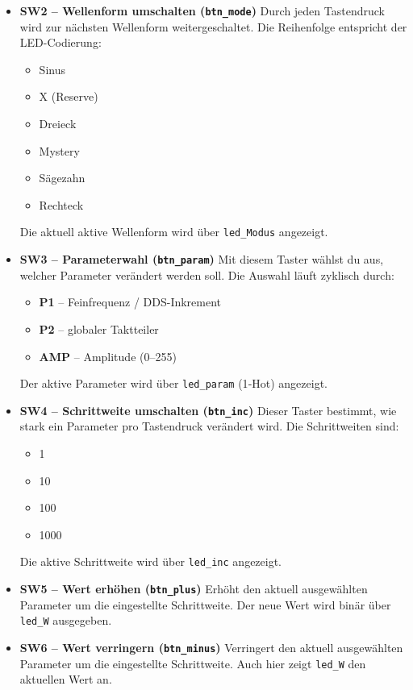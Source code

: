 \begin{itemize}
    \item \textbf{SW2 – Wellenform umschalten (\texttt{btn\_mode})}  
    Durch jeden Tastendruck wird zur nächsten Wellenform weitergeschaltet.
    Die Reihenfolge entspricht der LED-Codierung:
    \begin{itemize}
        \item Sinus
        \item X (Reserve)
        \item Dreieck
        \item Mystery
        \item Sägezahn
        \item Rechteck
    \end{itemize}
    Die aktuell aktive Wellenform wird über \texttt{led\_Modus} angezeigt.

    \item \textbf{SW3 – Parameterwahl (\texttt{btn\_param})}  
    Mit diesem Taster wählst du aus, welcher Parameter verändert werden soll.
    Die Auswahl läuft zyklisch durch:
    \begin{itemize}
        \item \textbf{P1} – Feinfrequenz / DDS-Inkrement
        \item \textbf{P2} – globaler Taktteiler
        \item \textbf{AMP} – Amplitude (0–255)
    \end{itemize}
    Der aktive Parameter wird über \texttt{led\_param} (1‑Hot) angezeigt.

    \item \textbf{SW4 – Schrittweite umschalten (\texttt{btn\_inc})}  
    Dieser Taster bestimmt, wie stark ein Parameter pro Tastendruck verändert wird.
    Die Schrittweiten sind:
    \begin{itemize}
        \item 1
        \item 10
        \item 100
        \item 1000
    \end{itemize}
    Die aktive Schrittweite wird über \texttt{led\_inc} angezeigt.

    \item \textbf{SW5 – Wert erhöhen (\texttt{btn\_plus})}  
    Erhöht den aktuell ausgewählten Parameter um die eingestellte Schrittweite.
    Der neue Wert wird binär über \texttt{led\_W} ausgegeben.

    \item \textbf{SW6 – Wert verringern (\texttt{btn\_minus})}  
    Verringert den aktuell ausgewählten Parameter um die eingestellte Schrittweite.
    Auch hier zeigt \texttt{led\_W} den aktuellen Wert an.
\end{itemize}

